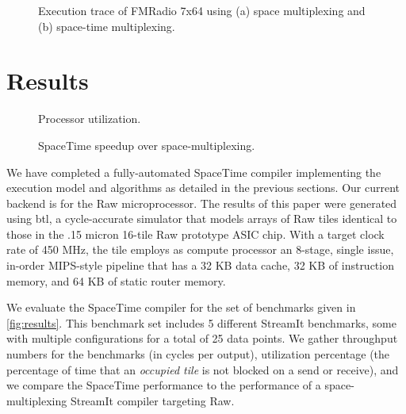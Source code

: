 \begin{figure}[t]
\centering
{}
\vspace{-6pt}
\caption{Execution trace of FMRadio 7x64 using (a) space multiplexing and (b) space-time multiplexing.
\protect\label{fig:bloodgraph}}
\end{figure}

\section{Results}
\label{sec:results}

\begin{figure*}[t]
\centering
{}
\vspace{-6pt}
\caption{Benchmark characteristics, performance evaluation and
comparison to space-multiplexing. 
\protect\label{fig:results}}
\end{figure*}
\begin{figure}[t]
\centering
{}
\vspace{-6pt}
\caption{Processor utilization.
\protect\label{fig:util}}
\end{figure}

\begin{figure}[t]
\centering
{}
\vspace{-6pt}
\caption{SpaceTime speedup over space-multiplexing.
\protect\label{fig:speedup}}
\end{figure}


We have completed a fully-automated SpaceTime compiler implementing
the execution model and algorithms as detailed in the previous
sections. Our current backend is for the Raw microprocessor. The
results of this paper were generated using btl, a cycle-accurate
simulator that models arrays of Raw tiles identical to those in the
.15 micron 16-tile Raw prototype ASIC chip.  With a target clock rate
of 450 MHz, the tile employs as compute processor an 8-stage, single
issue, in-order MIPS-style pipeline that has a 32 KB data cache, 32 KB
of instruction memory, and 64 KB of static router memory.

We evaluate the SpaceTime compiler for the set of benchmarks given in
\ref{fig:results}.  This benchmark set includes 5 different StreamIt
benchmarks, some with multiple configurations for a total of 25 data
points.  We gather throughput numbers for the benchmarks (in cycles
per output), utilization percentage (the percentage of time that an
{\it occupied tile} is not blocked on a send or receive), and we
compare the SpaceTime performance to the performance of a
space-multiplexing StreamIt compiler targeting Raw.  

